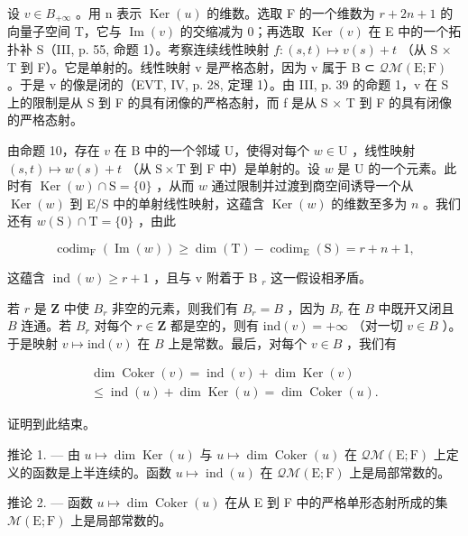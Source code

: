 设 \(v \in B_{+\infty}\) 。用 n 表示 \(\operatorname{Ker}(u)\) 的维数。选取 F 的一个维数为 \(r + 2n + 1\) 的向量子空间 T，它与 \(\operatorname{Im}(v)\) 的交缩减为 0；再选取 \(\operatorname{Ker}(v)\) 在 E 中的一个拓扑补 S（III, p. 55, 命题 1）。考察连续线性映射 \(f: (s, t) \mapsto v(s) + t\) （从 S × T 到 F）。它是单射的。线性映射 v 是严格态射，因为 v 属于 B ⊂ \(\mathcal{Q}\mathcal{M}(\mathrm{E};\mathrm{F})\) 。于是 v 的像是闭的（EVT, IV, p. 28, 定理 1）。由 III, p. 39 的命题 1，v 在 S 上的限制是从 S 到 F 的具有闭像的严格态射，而 f 是从 S × T 到 F 的具有闭像的严格态射。

由命题 10，存在 \(v\) 在 B 中的一个邻域 U，使得对每个 \(w \in \mathrm{U}\) ，线性映射 \((s,t) \mapsto w(s) + t\) （从 \(\mathrm{S} \times \mathrm{T}\) 到 F 中）是单射的。设 \(w\) 是 U 的一个元素。此时有 \(\operatorname{Ker}(w) \cap \mathrm{S} = \{0\}\) ，从而 \(w\) 通过限制并过渡到商空间诱导一个从 \(\operatorname{Ker}(w)\) 到 E/S 中的单射线性映射，这蕴含 \(\operatorname{Ker}(w)\) 的维数至多为 \(n\) 。我们还有 \(w(\mathrm{S}) \cap \mathrm{T} = \{0\}\) ，由此

\[
\operatorname{codim} _ {\mathrm{F}} (\operatorname{Im} (w)) \geqslant \dim (\mathrm{T}) - \operatorname{codim} _ {\mathrm{E}} (\mathrm{S}) = r + n + 1,
\]

这蕴含 \(\operatorname{ind}(w) \geqslant r + 1\) ，且与 v 附着于 B \(_{r}\) 这一假设相矛盾。

若 \(r\) 是 \(\mathbf{Z}\) 中使 \(B_r\) 非空的元素，则我们有 \(B_r = B\) ，因为 \(B_r\) 在 \(B\) 中既开又闭且 \(B\) 连通。若 \(B_r\) 对每个 \(r \in \mathbf{Z}\) 都是空的，则有 \(\text{ind}(v) = +\infty\) （对一切 \(v \in B\) ）。于是映射 \(v \mapsto \text{ind}(v)\) 在 \(B\) 上是常数。最后，对每个 \(v \in B\) ，我们有

\[
\begin{array}{c} \dim \operatorname{Coker} (v) = \operatorname{ind} (v) + \dim \operatorname{Ker} (v) \\ \leqslant \operatorname{ind} (u) + \dim \operatorname{Ker} (u) = \dim \operatorname{Coker} (u). \end{array}
\]

证明到此结束。

推论 1. --- 由 \(u \mapsto \dim \operatorname{Ker}(u)\) 与 \(u \mapsto \dim \operatorname{Coker}(u)\) 在 \(\mathcal{Q}\mathcal{M}(\mathrm{E};\mathrm{F})\) 上定义的函数是上半连续的。函数 \(u \mapsto \operatorname{ind}(u)\) 在 \(\mathcal{Q}\mathcal{M}(\mathrm{E};\mathrm{F})\) 上是局部常数的。

推论 2. --- 函数 \(u \mapsto \dim \operatorname{Coker}(u)\) 在从 E 到 F 中的严格单形态射所成的集 \(\mathcal{M}(\mathrm{E};\mathrm{F})\) 上是局部常数的。

